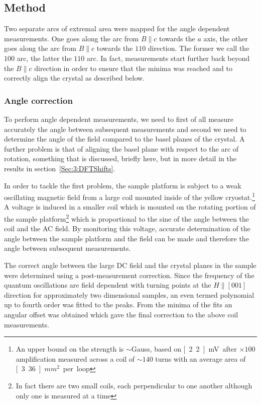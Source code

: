 \subsection{Method}

Two separate arcs of extremal area were mapped for the angle dependent measurements. One goes along the arc from $B\parallel c$ towards the $a$ axis, the other goes along the arc from $B\parallel c$ towards the $110$ direction. The former we call the $100$ arc, the latter the $110$ arc. In fact, measurements start further back beyond the $B\parallel c$ direction in order to ensure that the minima was reached and to correctly align the crystal as described below.

\subsubsection{Angle correction}
    \label{Sec:2:AngleCorrection}

To perform angle dependent measurements, we need to first of all measure accurately the angle between subsequent measurements and second we need to determine the angle of the field compared to the basel planes of the crystal. A further problem is that of aligning the basel plane with respect to the arc of rotation, something that is discussed, briefly here, but in more detail in the results in section~\ref{Sec:3:DFTShifts}.

In order to tackle the first problem, the sample platform is subject to a weak oscillating magnetic field from a large coil mounted inside of the yellow cryostat.\footnote{An upper bound on the strength is $\sim$\unit[500]{Gauss}, based on \unit[2.2]{mV} after $\times100$ amplification measured across a coil of $\sim140$ turns with an average area of \unit[3.36]{$mm^2$} per loop} A voltage is induced in a smaller coil which is mounted on the rotating portion of the sample platform\footnote{In fact there are two small coils, each perpendicular to one another although only one is measured at a time} which is proportional to the sine of the angle between the coil and the AC field. By monitoring this voltage, accurate determination of the angle between the sample platform and the field can be made and therefore the angle between subsequent measurements.

The correct angle between the large DC field and the crystal planes in the sample were determined using a post-measurement correction. Since the frequency of the quantum oscillations are field dependent with turning points at the $H\parallel [001]$ direction for approximately two dimensional samples, an even termed polynomial up to fourth order was fitted to the peaks. From the minima of the fits an angular offset was obtained which gave the final correction to the above coil measurements.

